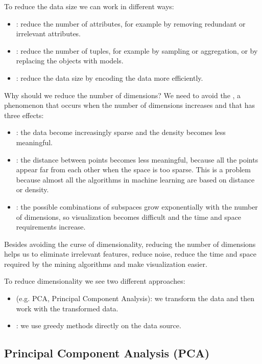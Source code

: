 To reduce the data size we can work in different ways:
\begin{itemize}
    \item {}: reduce the number of attributes, for example by removing redundant or irrelevant attributes.
    \item {}: reduce the number of tuples, for example by sampling or aggregation, or by replacing the objects with models.
    \item {}: reduce the data size by encoding the data more efficiently.
\end{itemize}

Why should we reduce the number of dimensions? We need to avoid the , a phenomenon that occurs when the number of dimensions increases and that has three effects:
\begin{itemize}
    \item {}: the data become increasingly sparse and the density becomes less meaningful.
    \item {}: the distance between points becomes less meaningful, because all the points appear far from each other when the space is too sparse. This is a problem because almost all the algorithms in machine learning are based on distance or density.
    \item {}: the possible combinations of subspaces grow exponentially with the number of dimensions, so visualization becomes difficult and the time and space requirements increase.
\end{itemize}

Besides avoiding the curse of dimensionality, reducing the number of dimensions helps us to eliminate irrelevant features, reduce noise, reduce the time and space required by the mining algorithms and make visualization easier.

To reduce dimensionality we see two different approaches:
\begin{itemize}
    \item {} (e.g. PCA, Principal Component Analysis): we transform the data and then work with the transformed data.
    \item {}: we use greedy methods directly on the data source.
\end{itemize}

\subsection{Principal Component Analysis (PCA)}

